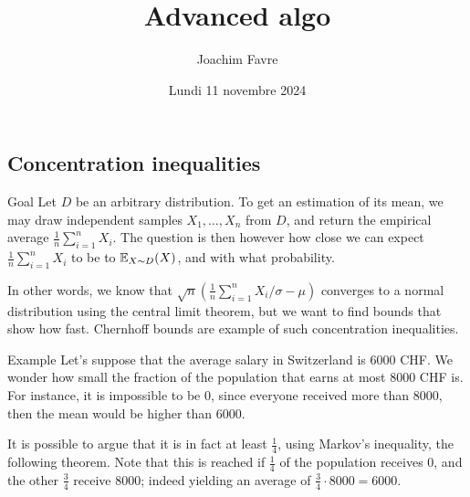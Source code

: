\documentclass[a4paper]{article}
\title{Advanced algo}
\author{Joachim Favre}
\date{Lundi 11 novembre 2024}
\begin{document}
\maketitle


\subsection{Concentration inequalities}

\begin{parag}{Goal}
    Let $D$ be an arbitrary distribution. To get an estimation of its mean, we may draw independent samples $X_1, \ldots, X_n$ from $D$, and return the empirical average $\frac{1}{n} \sum_{i=1}^{n} X_i$. The question is then however how close we can expect $\frac{1}{n} \sum_{i=1}^{n} X_i$ to be to $\exval_{X \followsdistr D}\left(X\right)$, and with what probability.

    In other words, we know that $\sqrt{n} \left(\frac{1}{n} \sum_{i=1}^{n} X_i / \sigma - \mu\right)$ converges to a normal distribution using the central limit theorem, but we want to find bounds that show how fast. Chernhoff bounds are example of such concentration inequalities.
\end{parag}

\begin{parag}{Example}
    Let's suppose that the average salary in Switzerland is 6000 CHF. We wonder how small the fraction of the population that earns at most 8000 CHF is. For instance, it is impossible to be 0, since everyone received more than 8000, then the mean would be higher than 6000.

    It is possible to argue that it is in fact at least $\frac{1}{4}$, using Markov's inequality, the following theorem. Note that this is reached if $\frac{1}{4}$ of the population receives 0, and the other $\frac{3}{4}$ receive 8000; indeed yielding an average of $\frac{3}{4}\cdot 8000 = 6000$.
\end{parag}
\end{document}
